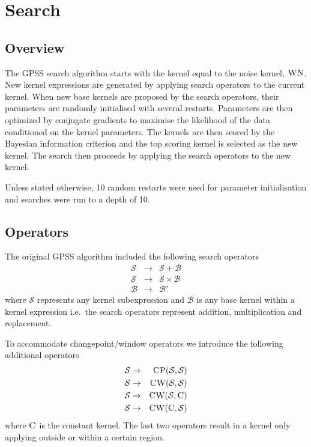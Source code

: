 \documentclass{article}
\def\ie{i.e.\ }
\begin{document}
\section{Search}

\subsection{Overview}

The GPSS search algorithm starts with the kernel equal to the noise kernel, ${\textsc{WN}}$.
New kernel expressions are generated by applying search operators to the current kernel.
When new base kernels are proposed by the search operators, their parameters are randomly initialised with several restarts.
Parameters are then optimized by conjugate gradients to maximise the likelihood of the data conditioned on the kernel parameters.
The kernels are then scored by the Bayesian information criterion and the top scoring kernel is selected as the new kernel.
The search then proceeds by applying the search operators to the new kernel.

Unless stated otherwise, 10 random restarts were used for parameter initialisation and searches were run to a depth of 10.

\subsection{Operators}

The original GPSS algorithm included the following search operators
%
\begin{eqnarray}
\mathcal{S} &\to& \mathcal{S} + \mathcal{B} \\
\mathcal{S} &\to& \mathcal{S} \times \mathcal{B} \\
\mathcal{B} &\to& \mathcal{B'}
\end{eqnarray}
%
where $\mathcal{S}$ represents any kernel subexpression and $\mathcal{B}$ is any base kernel within a kernel expression \ie the search operators represent addition, multiplication and replacement.

To accommodate changepoint/window operators we introduce the following additional operators
%
\begin{eqnarray}
\mathcal{S} &\to& {\textsc{CP}}(\mathcal{S},\mathcal{S}) \\
\mathcal{S} &\to& {\textsc{CW}}(\mathcal{S},\mathcal{S}) \\
\mathcal{S} &\to& {\textsc{CW}}(\mathcal{S},{\textsc{C}}) \\
\mathcal{S} &\to& {\textsc{CW}}({\textsc{C}},\mathcal{S})
\end{eqnarray}
%
where ${\textsc{C}}$ is the constant kernel.
The last two operators result in a kernel only applying outside or within a certain region.
\end{document}
